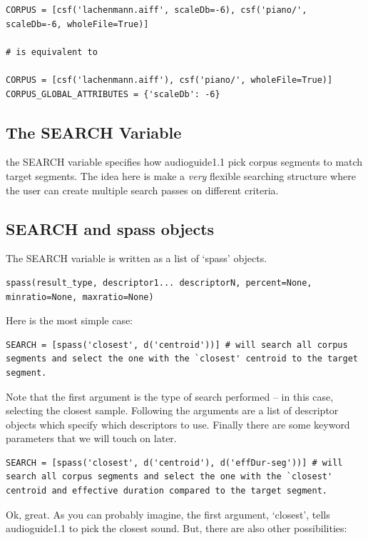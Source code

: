 \documentclass{article}
\newcommand{\ag}{audioguide1.1 }
\begin{document}
\begin{spacing}{1.2}
\begin{lstlisting}
CORPUS = [csf('lachenmann.aiff', scaleDb=-6), csf('piano/', scaleDb=-6, wholeFile=True)]

# is equivalent to 

CORPUS = [csf('lachenmann.aiff'), csf('piano/', wholeFile=True)]
CORPUS_GLOBAL_ATTRIBUTES = {'scaleDb': -6}
\end{lstlisting}


\subsection{The SEARCH Variable}
the SEARCH variable specifies how \ag pick corpus segments to match target segments.  The idea here is make a \emph{very} flexible searching structure where the user can create multiple search passes on different criteria.


\subsection{SEARCH and spass objects}

The SEARCH variable is written as a list of `spass' objects.  
\begin{lstlisting}
spass(result_type, descriptor1... descriptorN, percent=None, minratio=None, maxratio=None)
\end{lstlisting}

Here is the most simple case:
\begin{lstlisting}
SEARCH = [spass('closest', d('centroid'))] # will search all corpus segments and select the one with the `closest' centroid to the target segment.
\end{lstlisting}

Note that the first argument is the type of search performed -- in this case, selecting the closest sample.  Following the arguments are a list of descriptor objects which specify which descriptors to use.  Finally there are some keyword parameters that we will touch on later.

\begin{lstlisting}
SEARCH = [spass('closest', d('centroid'), d('effDur-seg'))] # will search all corpus segments and select the one with the `closest' centroid and effective duration compared to the target segment.
\end{lstlisting}

Ok, great.  As you can probably imagine, the first argument, `closest', tells \ag to pick the closest sound.  But, there are also other possibilities:


\end{spacing}
\end{document}
